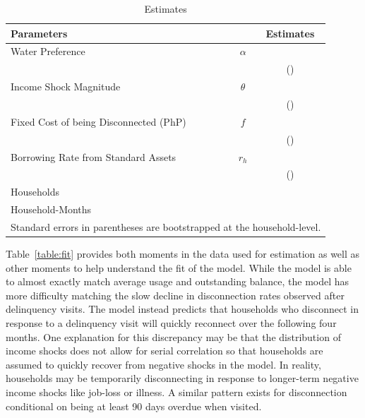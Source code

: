 \documentclass[12pt]{article}
\begin{document}
\begin{table}[h!]
\centering
\caption{Estimates}\label{table:estimates}
\vspace{-2mm}
\begin{tabular}{l*{1}{cc}}
\toprule
Parameters  &   & Estimates \\
\midrule
Water Preference & $\alpha$ &  \\
 &  & (\unskip) \\[.4em]
Income Shock Magnitude & $\theta$ &  \\
 &  & (\unskip) \\[.4em]
Fixed Cost of being Disconnected (PhP) & $f$ &   \\
 &  &  (\unskip) \\[.4em]
Borrowing Rate from Standard Assets & $r_h$ &  \\
 &  & (\unskip) \\[.8em]
Households & &  \\
Household-Months & &  \\
\bottomrule
\multicolumn{3}{l}{\scriptsize Standard errors in parentheses are bootstrapped at the household-level.} %
\end{tabular}
\end{table}

Table~\ref{table:fit} provides both moments in the data used for estimation as well as other moments to help understand the fit of the model.  While the model is able to almost exactly match average usage and outstanding balance, the model has more difficulty matching the slow decline in disconnection rates observed after delinquency visits.  The model instead predicts that households who disconnect in response to a delinquency visit will quickly reconnect over the following four months.  One explanation for this discrepancy may be that the distribution of income shocks does not allow for serial correlation so that households are assumed to quickly recover from negative shocks in the model.  In reality, households may be temporarily disconnecting in response to longer-term negative income shocks like job-loss or illness.  A similar pattern exists for disconnection conditional on being at least 90 days overdue when visited.
\end{document}
